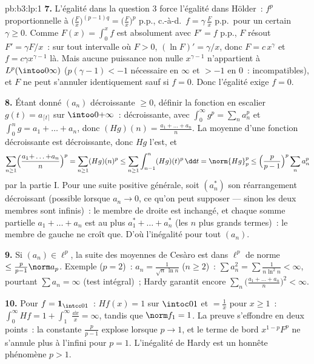 \begin{solution}{pb:b3:lp:1}
\textbf{7.} L'égalité dans la question 3 force l'égalité
dans Hölder~: $f^p$ proportionnelle à $\bigl(\frac
Fx\bigr)^{(p-1)q} = \bigl(\frac Fx\bigr)^p$ p.p., c.-à-d.\
$f = \gamma\,\frac Fx$ p.p.\ pour un certain $\gamma \geq
0$. Comme $F(x) = \int_0^xf$ est absolument  avec
$F' = f$ p.p., $F$ résout $F' = \gamma F/x$~: sur tout
intervalle où $F > 0$, $(\ln F)' = \gamma/x$, donc $F =
c\,x^{\gamma}$ et $f = c\gamma x^{\gamma - 1}$ là. Mais
aucune puissance non nulle $x^{\gamma-1}$ n'appartient à
$L^p(\intoo0\infty)$ ($p(\gamma - 1) < -1$ nécessaire en
$\infty$ et $> -1$ en $0$~: incompatibles), et $F$ ne peut
s'annuler identiquement sauf si $f = 0$. Donc l'égalité
exige $f = 0$.

\textbf{8.} Étant donné $(a_n)$ décroissante $\geq 0$,
définir la fonction en escalier $g(t) = a_{\lceil t\rceil}$
sur $\intoo0{+\infty}$~: décroissante, avec $\int_0^\infty
g^p = \sum_na_n^p$ et $\int_0^ng = a_1 + \dots + a_n$, donc
$(Hg)(n) = \frac{a_1 + \dots + a_n}n$. La moyenne d'une
fonction décroissante est décroissante, donc $Hg$ l'est, et
\[
\sum_{n\geq1}\Bigl(\frac{a_1{+}\dots{+}a_n}n\Bigr)^p
= \sum_{n\geq1}(Hg)(n)^p
\leq \sum_{n\geq1}\int_{n-1}^n (Hg)(t)^p\,\dd t
= \norm{Hg}_p^p
\leq \Bigl(\frac p{p-1}\Bigr)^p\sum_n a_n^p
\]
par la partie I. Pour une suite positive générale, soit
$(a_n^*)$ son réarrangement décroissant (possible lorsque
$a_n \to 0$, ce qu'on peut supposer --- sinon les deux
membres sont infinis)~: le membre de droite est inchangé, et
chaque somme partielle $a_1 + \dots + a_n$ est au plus
$a_1^* + \dots + a_n^*$ (les $n$ plus grands termes)~: le
membre de gauche ne croît que. D'où l'inégalité pour tout
$(a_n)$.

\textbf{9.} Si $(a_n) \in \ell^p$, la suite des moyennes de
Cesàro est dans $\ell^p$ de norme $\leq \frac
p{p-1}\norm a_p$. Exemple ($p = 2$)~: $a_n =
\frac1{\sqrt n\,\ln n}$ ($n \geq 2$)~: $\sum a_n^2 =
\sum\frac1{n\ln^2n} < \infty$, pourtant $\sum a_n =
\infty$ (test intégral)~; Hardy garantit encore
$\sum_n\bigl(\frac{a_1 + \dots + a_n}n\bigr)^2 < \infty$.

\textbf{10.} Pour $f = \mathbf 1_{\intcc01}$~: $Hf(x) = 1$
sur $\intoc01$ et $= \frac1x$ pour $x \geq 1$~:
$\int_0^\infty Hf = 1 + \int_1^\infty\frac{\dd x}x =
\infty$, tandis que $\norm f_1 = 1$. La preuve s'effondre
en deux points~: la constante $\frac p{p-1}$ explose
lorsque $p \to 1$, et le terme de bord $x^{1-p}F^p$ ne
s'annule plus à l'infini pour $p = 1$. L'inégalité de Hardy
est un honnête phénomène $p > 1$.


\end{solution}

